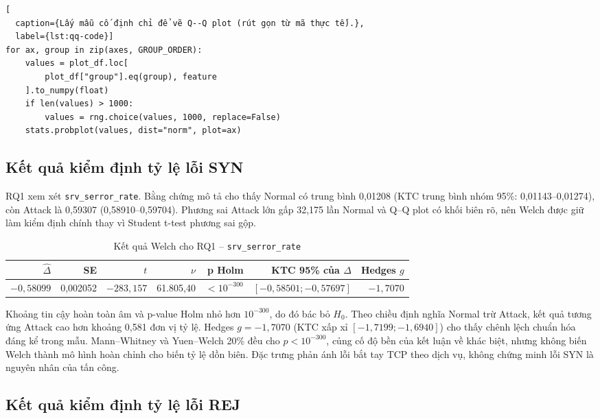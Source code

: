 \begin{lstlisting}[
  caption={Lấy mẫu cố định chỉ để vẽ Q--Q plot (rút gọn từ mã thực tế).},
  label={lst:qq-code}]
for ax, group in zip(axes, GROUP_ORDER):
    values = plot_df.loc[
        plot_df["group"].eq(group), feature
    ].to_numpy(float)
    if len(values) > 1000:
        values = rng.choice(values, 1000, replace=False)
    stats.probplot(values, dist="norm", plot=ax)
\end{lstlisting}

\subsection{Kết quả kiểm định tỷ lệ lỗi SYN}
\label{subsec:two-sample-rq1}

RQ1 xem xét \texttt{srv\_serror\_rate}. Bằng chứng mô tả cho thấy Normal có trung
bình 0,01208 (KTC trung bình nhóm 95\%: 0,01143--0,01274), còn Attack là 0,59307
(0,58910--0,59704). Phương sai Attack lớn gấp 32,175 lần Normal và Q--Q plot có khối
biên rõ, nên Welch được giữ làm kiểm định chính thay vì Student t-test phương sai gộp.

\begin{table}[H]
\centering
\caption{Kết quả Welch cho RQ1 -- \texttt{srv\_serror\_rate}}
\label{tab:two-sample-rq1}
\small
\begin{tabular}{rrrrrrr}
\toprule
$\widehat\Delta$ & SE & $t$ & $\nu$ & p Holm & KTC 95\% của $\Delta$ & Hedges $g$ \\
\midrule
$-0{,}58099$ & 0,002052 & $-283{,}157$ & 61.805,40 & $<10^{-300}$ & $[-0{,}58501;-0{,}57697]$ & $-1{,}7070$ \\
\bottomrule
\end{tabular}
\end{table}

Khoảng tin cậy hoàn toàn âm và p-value Holm nhỏ hơn $10^{-300}$, do đó bác bỏ
$H_0$. Theo chiều định nghĩa Normal trừ Attack, kết quả tương ứng Attack cao hơn khoảng
0,581 đơn vị tỷ lệ. Hedges $g=-1{,}7070$ (KTC xấp xỉ
$[-1{,}7199;-1{,}6940]$) cho thấy chênh lệch chuẩn hóa đáng kể trong mẫu. Mann--Whitney
và Yuen--Welch 20\% đều cho $p<10^{-300}$, củng cố độ bền của kết luận về khác biệt,
nhưng không biến Welch thành mô hình hoàn chỉnh cho biến tỷ lệ dồn biên. Đặc trưng phản
ánh lỗi bắt tay TCP theo dịch vụ, không chứng minh lỗi SYN là nguyên nhân của tấn công.

\subsection{Kết quả kiểm định tỷ lệ lỗi REJ}
\label{subsec:two-sample-rq2}

